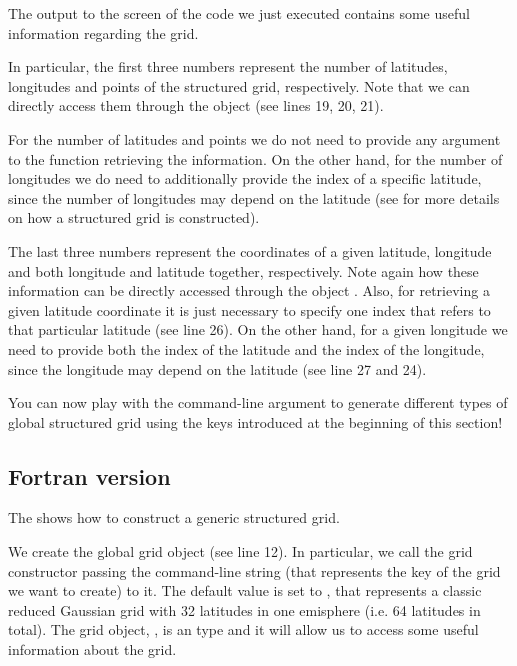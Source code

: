 The output to the screen of the code we just executed 
contains some useful information regarding the grid. 

In particular, the first three numbers represent the 
number of latitudes, longitudes and points of the structured
grid, respectively. Note that we can directly access them 
through the  object (see lines 19, 20, 21).
\begin{tipbox}
For the number of latitudes and points we do not need to provide
any argument to the function retrieving the information. On the 
other hand, for the number of longitudes we do need to additionally 
provide the index of a specific latitude, since the number of 
longitudes may depend on the latitude (see  
for more details on how a structured grid is constructed). 
\end{tipbox}

The last three numbers represent the coordinates of a given 
latitude, longitude and both longitude and latitude together, 
respectively. Note again how these information can be directly 
accessed through the object . 
Also, for retrieving a given latitude coordinate it is just 
necessary to specify one index that refers to that particular 
latitude (see line 26). On the other hand, for a given longitude 
we need to provide both the index of the latitude and the index 
of the longitude, since the longitude may depend on the latitude 
(see line 27 and 24).

You can now play with the command-line argument to generate 
different types of global structured grid using the keys introduced 
at the beginning of this section!

\subsection{Fortran version}
The  shows how to construct a generic 
structured grid.

%

%

We create the global 
grid object (see line 12). In particular, we call 
the grid constructor passing the command-line string 
(that represents the key of the grid we want to create) to 
it. The default value is set to , that represents 
a classic reduced Gaussian grid with 32 latitudes in one emisphere 
(i.e. 64 latitudes in total).  
The grid object, , is 
an  type and it will allow 
us to access some useful information about the grid.  

